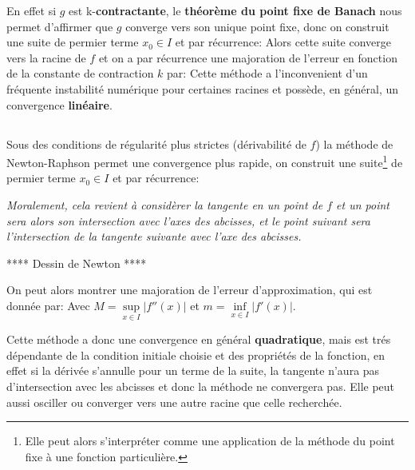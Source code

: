 En effet si \(g\) est k-\textbf{contractante}, le \textbf{théorème du point fixe de Banach} nous permet d'affirmer que \(g\) converge vers son unique point fixe, donc on construit une suite de permier terme \(x_0 \in I\) et par récurrence:
Alors cette suite converge vers la racine de \(f\) et on a par récurrence une majoration de l'erreur en fonction de la constante de contraction \(k\) par:
Cette méthode a l'inconvenient d'un fréquente instabilité numérique pour certaines racines et possède, en général, un convergence \textbf{linéaire}.

\subsection*{}
Sous des conditions de régularité plus strictes (dérivabilité de \(f\)) la méthode de Newton-Raphson permet une convergence plus rapide, on construit une suite\footnote[1]{Elle peut alors s'interpréter comme une application de la méthode du point fixe à une fonction particulière.} de permier terme \(x_0 \in I\) et par récurrence:
\begin{center}
   \textit{Moralement, cela revient à considèrer la tangente en un point de \(f\) et un point sera alors son intersection avec l'axes des abcisses, et le point suivant sera l'intersection de la tangente suivante avec l'axe des abcisses.}
\end{center}
\begin{center}
   **** Dessin de Newton ****
\end{center}
On peut alors montrer une majoration de l'erreur d'approximation, qui est donnée par:
Avec \(M = \underset{x \in I}{\sup} |f''(x)|\) et \(m = \underset{x \in I}{\inf} |f'(x)|\).\<

Cette méthode a donc une convergence en général \textbf{quadratique}, mais est trés dépendante de la condition initiale choisie et des propriétés de la fonction, en effet si la dérivée s'annulle pour un terme de la suite, la tangente n'aura pas d'intersection avec les abcisses et donc la méthode ne convergera pas. Elle peut aussi osciller ou converger vers une autre racine que celle recherchée.

